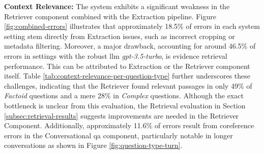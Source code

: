 \noindent\textbf{Context Relevance:} The system exhibits a significant weakness in the Retriever component combined with the Extraction pipeline. Figure \ref{fig:combined-errors} illustrates that approximately 18.5\% of errors in each system setting stem directly from Extraction issues, such as incorrect cropping or metadata filtering. Moreover, a major drawback, accounting for around 46.5\% of errors in settings with the robust \gls{llm} \textit{gpt-3.5-turbo}, is evidence retrieval performance. This can be attributed to Extraction or the Retriever component itself. Table \ref{tab:context-relevance-per-question-type} further underscores these challenges, indicating that the Retriever found relevant passages in only 49\% of \textit{Factoid} questions and a mere 28\% in \textit{Complex} questions. Although the exact bottleneck is unclear from this evaluation, the Retrieval evaluation in Section \ref{subsec:retrieval-results} suggests improvements are needed in the Retriever Component. Additionally, approximately 11.6\% of errors result from coreference errors in the Conversational \gls{qa} component, particularly notable in longer conversations as shown in Figure \ref{fig:question-type-turn}.

